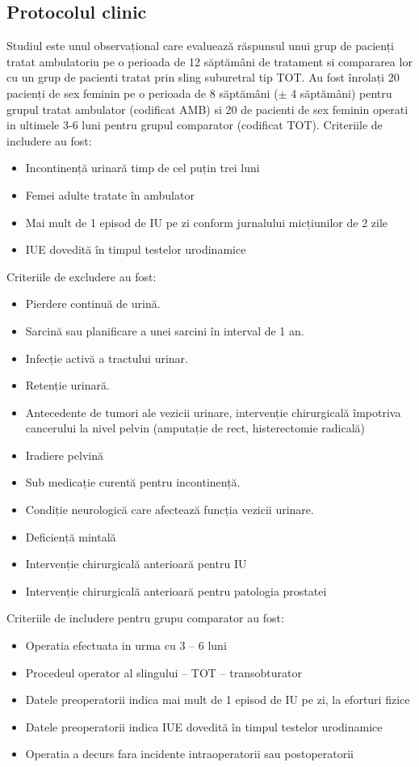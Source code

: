 \documentclass[12pt,draft]{article}
\begin{document}
\subsection{Protocolul clinic}
  Studiul este unul observațional care evaluează răspunsul unui grup de pacienți tratat ambulatoriu pe o perioada de 12 săptămâni de tratament si compararea lor cu un grup de pacienti tratat prin sling suburetral tip \ac{TOT}. Au fost înrolați 20 pacienți de sex feminin pe o perioada de 8 săptămâni ($\pm$ 4 săptămâni) pentru grupul tratat ambulator (codificat AMB) si 20 de pacienti de sex feminin operati in ultimele 3-6 luni pentru grupul comparator (codificat TOT). Criteriile de includere au fost:
  \begin{itemize}
    \item Incontinență urinară timp de cel puțin trei luni
    \item Femei adulte tratate în ambulator
    \item Mai mult de 1 episod de IU pe zi conform jurnalului micțiunilor de 2 zile
    \item IUE dovedită în timpul testelor urodinamice
   \end{itemize}
 
 Criteriile de excludere au fost:
  \begin{itemize}
    \item Pierdere continuă de urină.
    \item Sarcină sau planificare a unei sarcini în interval de 1 an.
    \item Infecție activă a tractului urinar.
    \item Retenție urinară.
    \item Antecedente de tumori ale vezicii urinare, intervenție chirurgicală împotriva cancerului la nivel pelvin (amputație de rect, histerectomie radicală)
    \item Iradiere pelvină
    \item Sub medicație curentă pentru incontinență.
    \item Condiție neurologică care afectează funcția vezicii urinare.
    \item Deficiență mintală 
    \item Intervenție chirurgicală anterioară pentru IU
    \item Intervenție chirurgicală anterioară pentru patologia prostatei 
   \end{itemize}
   
   Criteriile de includere pentru grupu comparator au fost:
  \begin{itemize}
    \item Operatia efectuata in urma cu 3 – 6 luni
    \item Procedeul operator al slingului – TOT – transobturator
    \item Datele preoperatorii indica mai mult de 1 episod de IU pe zi, la eforturi fizice
    \item Datele preoperatorii indica IUE dovedită în timpul testelor urodinamice
    \item Operatia a decurs fara incidente intraoperatorii sau postoperatorii
   \end{itemize}
\end{document}
